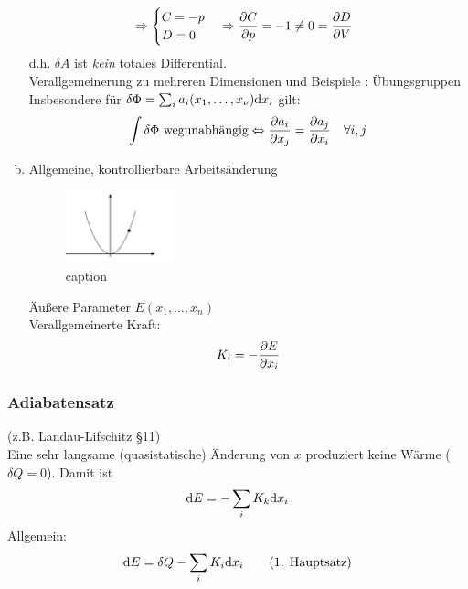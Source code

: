 \begin{enumerate}[a)]
\begin{equation}
\begin{split}
            & \Rightarrow
            \begin{cases}
                C = - p \\
                D = 0
            \end{cases}
            \Rightarrow \frac{\partial C}{\partial p} = -1 \neq 0 = \frac{\partial D}{\partial V}
        \end{split}
    \end{equation}
    d.h. $\delta A$ ist \emph{kein} totales Differential. \\[\baselineskip]
    Verallgemeinerung zu mehreren Dimensionen und Beispiele : Übungsgruppen \\
    Insbesondere für $\delta \Phi = \sum_i a_i (x_1, \ldots, x_\nu) \mathrm{d} x_i$ gilt:
    \begin{equation}
        \int \delta \Phi \text{ wegunabhängig} \Leftrightarrow \frac{\partial a_i}{\partial x_j} = \frac{\partial a_j}{\partial x_i} \quad \forall i, j
    \end{equation}
    \item Allgemeine, kontrollierbare Arbeitsänderung
    \begin{figure}[H]
        \begin{center}
            \includegraphics[width=0.3\textwidth]{../img/controlledDeltaWork.pdf}
            \caption{caption}  %
            \label{img:controlledDeltaWork}
        \end{center}
    \end{figure}
    Äußere Parameter $E(x_1, \ldots, x_n)$ \\
    Verallgemeinerte Kraft:
    \begin{equation}
        K_i = - \frac{\partial E}{\partial x_i}
    \end{equation}
\end{enumerate}
\subsubsection{Adiabatensatz}
(z.B. Landau-Lifschitz §11) \\
Eine sehr langsame (quasistatische) Änderung von $x$ produziert keine Wärme ($\delta Q = 0$). Damit ist 
\begin{equation}
    \mathrm{d} E = - \sum_i K_k \mathrm{d} x_i
\end{equation}
Allgemein:
\begin{equation}
    \mathrm{d} E = \delta Q - \sum_i K_i \mathrm{d} x_i \qquad \text{(1. Hauptsatz)}
\end{equation}


